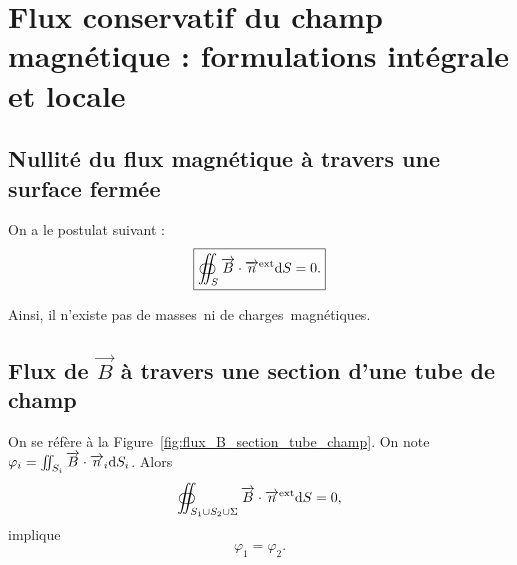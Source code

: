 \section[Flux du champ magnétique]{Flux conservatif du champ magnétique : formulations intégrale et locale}
    \subsection{Nullité du flux magnétique à travers une surface fermée}

        On a le postulat suivant :
        \begin{equation*}
            \boxed{
                \oiint_{S}\protect\overrightarrow{{B}}\cdot\protect\overrightarrow{{n}}^{\text{ext}}\mathrm{d} S=0.
            }
        \end{equation*}

        Ainsi, il n'existe pas de \og masses\fg~ni de \og charges\fg~magnétiques.

    \subsection{Flux de \texorpdfstring{$\vec{B}$}{B} à travers une section d'une tube de champ}

        On se réfère à la Figure~\ref{fig:flux_B_section_tube_champ}. On note $\varphi_{i}=\iint_{S_i}\protect\overrightarrow{{B}}\cdot\protect\overrightarrow{{n}}_i\mathrm{d} S_i$. Alors
        \begin{equation*}
            \oiint_{S_1\cup S_2\cup\Sigma}\protect\overrightarrow{{B}}\cdot\protect\overrightarrow{{n}}^{\text{ext}}\mathrm{d} S=0,
        \end{equation*}
        implique
        \begin{equation*}
            \boxed{
                \varphi_1=\varphi_2.
            }
        \end{equation*}

